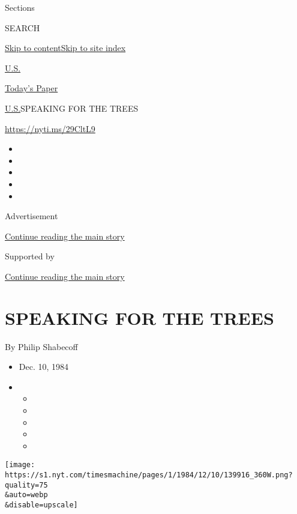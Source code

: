 Sections

SEARCH

\protect\hyperlink{site-content}{Skip to
content}\protect\hyperlink{site-index}{Skip to site index}

\href{https://www.nytimes.com/section/us}{U.S.}

\href{https://myaccount.nytimes.com/auth/login?response_type=cookie\&client_id=vi}{}

\href{https://www.nytimes.com/section/todayspaper}{Today's Paper}

\href{/section/us}{U.S.}\textbar{}SPEAKING FOR THE TREES

\href{https://nyti.ms/29CltL9}{https://nyti.ms/29CltL9}

\begin{itemize}
\item
\item
\item
\item
\item
\end{itemize}

Advertisement

\protect\hyperlink{after-top}{Continue reading the main story}

Supported by

\protect\hyperlink{after-sponsor}{Continue reading the main story}

\hypertarget{speaking-for-the-trees}{%
\section{SPEAKING FOR THE TREES}\label{speaking-for-the-trees}}

By Philip Shabecoff

\begin{itemize}
\item
  Dec. 10, 1984
\item
  \begin{itemize}
  \item
  \item
  \item
  \item
  \item
  \end{itemize}
\end{itemize}

\texttt{[image: https://s1.nyt.com/timesmachine/pages/1/1984/12/10/139916\_360W.png?quality=75\\\&auto=webp\\\&disable=upscale]}

